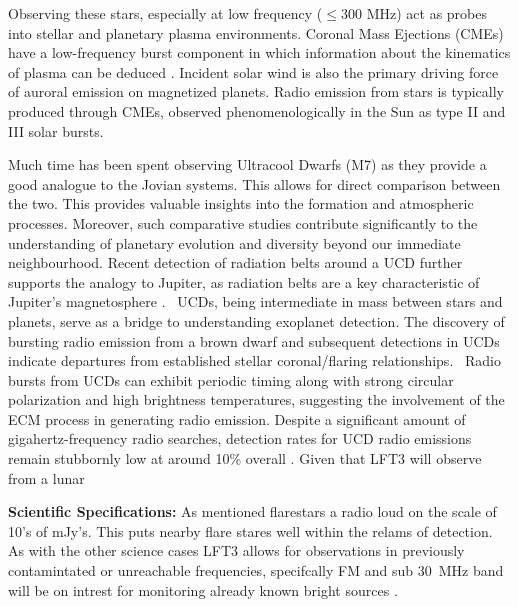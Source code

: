Observing these stars, especially at low frequency ($\leq 300$ MHz) act as probes into stellar and planetary plasma environments. Coronal Mass Ejections (CMEs) have a low-frequency burst component in which information about the kinematics of plasma can be deduced \citep{villadsen_ultra-wideband_2019}. Incident solar wind is also the primary driving force of auroral emission on magnetized planets. Radio emission from stars is typically produced through CMEs, observed phenomenologically in the Sun as type II and III solar bursts.

Much time has been spent observing Ultracool Dwarfs (M7) as they provide a good analogue to the Jovian systems. This allows for direct comparison between the two.  This provides valuable insights into the formation and atmospheric processes. Moreover, such comparative studies contribute significantly to the understanding of planetary evolution and diversity beyond our immediate neighbourhood. Recent detection of radiation belts around a UCD further supports the analogy to Jupiter, as radiation belts are a key characteristic of Jupiter's magnetosphere \citep{joe_nature_review}. \ UCDs, being intermediate in mass between stars and planets, serve as a bridge to understanding exoplanet detection. The discovery of bursting radio emission from a brown dwarf and subsequent detections in UCDs indicate departures from established stellar coronal/flaring relationships. \ Radio bursts from UCDs can exhibit periodic timing \citep{hallinan_rotational_2006} along with strong circular polarization and high brightness temperatures, suggesting the involvement of the ECM process in generating radio emission. Despite a significant amount of gigahertz-frequency radio searches, detection rates for UCD radio emissions remain stubbornly low at around 10\% overall \citep{lynch_radio_2016}. Given that LFT3 will observe from a lunar 



\textbf{Scientific Specifications:} As mentioned flarestars a radio loud on the scale of 10's of mJy's. This puts nearby flare stares well within the relams of detection. As with the other science cases LFT3 allows for observations in previously contamintated or unreachable frequencies, specifcally FM and sub 30~MHz band will be on intrest for monitoring already known bright sources \citep{joe_nature_review}.







